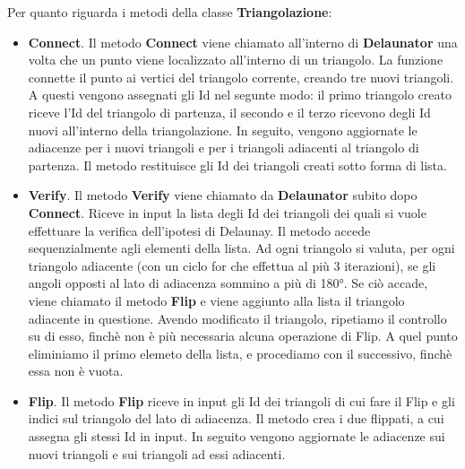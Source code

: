 \documentclass{article}
\begin{document}
Per quanto riguarda i metodi della classe \textbf{Triangolazione}:

\begin{itemize}
\item \textbf{Connect}. Il metodo \textbf{Connect} viene chiamato all'interno di \textbf{Delaunator} una volta che un punto viene localizzato all'interno di un triangolo.  La funzione connette il punto ai vertici del triangolo corrente,  creando tre nuovi triangoli.  A questi vengono assegnati gli Id nel segunte modo: il primo triangolo creato riceve l'Id del triangolo di partenza, il secondo e il terzo ricevono degli Id nuovi all'interno della triangolazione. In seguito, vengono aggiornate le adiacenze per i nuovi triangoli e per i triangoli adiacenti al triangolo di partenza.  Il metodo restituisce gli Id dei triangoli creati sotto forma di lista.

\item \textbf{Verify}. Il metodo \textbf{Verify} viene chiamato da \textbf{Delaunator} subito dopo \textbf{Connect}.  Riceve in input la lista degli Id dei triangoli dei quali si vuole effettuare la verifica dell'ipotesi di Delaunay.  Il metodo accede sequenzialmente agli elementi della lista.  Ad ogni triangolo si valuta, per ogni triangolo adiacente (con un ciclo for che effettua al più 3 iterazioni),  se gli angoli opposti al lato di adiacenza sommino a più di 180°.  Se ciò accade, viene chiamato il metodo \textbf{Flip} e viene aggiunto alla lista il triangolo adiacente in questione. Avendo modificato il triangolo, ripetiamo il controllo su di esso, finchè non è più necessaria alcuna operazione di Flip. A quel punto eliminiamo il primo elemeto della lista, e procediamo con il successivo, finchè essa non è vuota.

\item \textbf{Flip}. Il metodo \textbf{Flip} riceve in input gli Id dei triangoli di cui fare il Flip e gli indici sul triangolo del lato di adiacenza.  Il metodo crea i due flippati, a cui assegna gli stessi Id in input.  In seguito vengono aggiornate le adiacenze sui nuovi triangoli e sui triangoli ad essi adiacenti.

\end{itemize}
\end{document}
